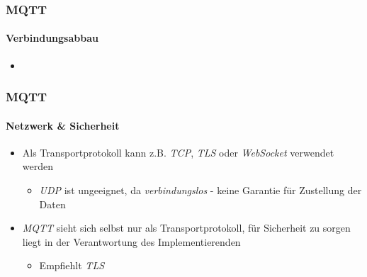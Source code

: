 \documentclass{beamer}
\begin{document}
\begin{frame}

\frametitle{MQTT}
\framesubtitle{Verbindungsabbau}
\begin{itemize}
	\item 
\end{itemize}

\end{frame}

\begin{frame}

\frametitle{MQTT}
\framesubtitle{Netzwerk \& Sicherheit}
\begin{itemize}
	\item Als Transportprotokoll kann z.B. \textit{TCP}, \textit{TLS} oder \textit{WebSocket} verwendet werden
	\begin{itemize}
		\item \textit{UDP} ist ungeeignet, da \textit{verbindungslos} - keine Garantie für Zustellung der Daten
	\end{itemize}
	\item \textit{MQTT} sieht sich selbst nur als Transportprotokoll, für Sicherheit zu sorgen liegt in der Verantwortung des Implementierenden
	\begin{itemize}
		\item Empfiehlt \textit{TLS}
	\end{itemize}
\end{itemize}

\end{frame}
\end{document}
